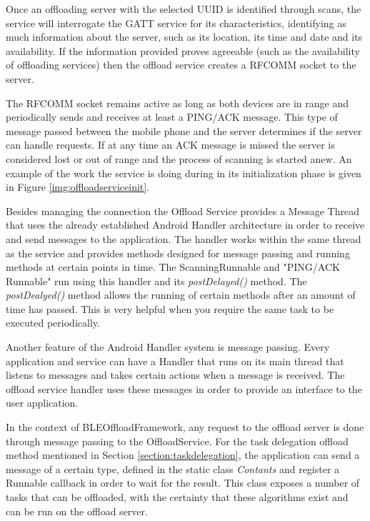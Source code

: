 Once an offloading server with the selected UUID is identified through scans, the service will interrogate the GATT service for its characteristics, identifying as much information about the server, such as its location, its time and date and its availability. If the information provided proves agreeable (such as the availability of offloading services) then the offload service creates a RFCOMM socket to the server.

The RFCOMM socket remains active as long as both devices are in range and periodically sends and receives at least a PING/ACK message. This type of message passed between the mobile phone and the server determines if the server can handle requests. If at any time an ACK message is missed the server is considered lost or out of range and the process of scanning is started anew. An example of the work the service is doing during in its initialization phase is given in Figure \ref{img:offloadserviceinit}.



Besides managing the connection the Offload Service provides a Message Thread that uses the already established Android Handler architecture in order to receive and send messages to the application. The handler works within the same thread as the service and provides methods designed for message passing and running methods at certain points in time. The ScanningRunnable and "PING/ACK Runnable" run using this handler and its \textit{postDelayed()} method. The \textit{postDealyed()} method allows the running of certain methods after an amount of time has passed. This is very helpful when you require the same task to be executed periodically.

Another feature of the Android Handler system is message passing. Every application and service can have a Handler that runs on its main thread that listens to messages and takes certain actions when a message is received. The offload service handler uses these messages in order to provide an interface to the user application.

In the context of BLEOffloadFramework, any request to the offload server is done through message passing to the OffloadService. For the task delegation offload method mentioned in Section \ref{section:taskdelegation}, the application can send a message of a certain type, defined in the static class \textit{Contants} and register a Runnable callback in order to wait for the result. This class exposes a number of tasks that can be offloaded, with the certainty that these algorithms exist and can be run on the offload server.

